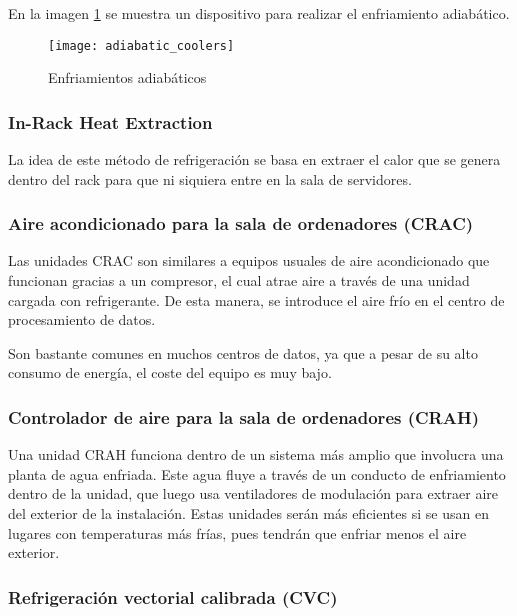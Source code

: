 En la imagen \ref{adiabatic_coolers} se muestra un dispositivo para realizar el enfriamiento adiabático.

\begin{figure}
    \begin{center}
    \caption{Enfriamientos adiabáticos}
    \label{adiabatic_coolers}
    \texttt{[image: adiabatic\_coolers]}
    \end{center}
\end{figure}

\subsubsection{In-Rack Heat Extraction}

La idea de este método de refrigeración se basa en extraer el calor que se genera dentro del rack para que ni siquiera entre en la sala de servidores.

\subsubsection{Aire acondicionado para la sala de ordenadores (CRAC)}

Las unidades CRAC son similares a equipos usuales de aire acondicionado que funcionan gracias a un compresor, el cual atrae aire a través de una unidad cargada con refrigerante. De esta manera, se introduce el aire frío en el centro de procesamiento de datos.

Son bastante comunes en muchos centros de datos, ya que a pesar de su alto consumo de energía, el coste del equipo es muy bajo.

\subsubsection{Controlador de aire para la sala de ordenadores (CRAH)}

Una unidad CRAH funciona dentro de un sistema más amplio que involucra una planta de agua enfriada. Este agua fluye a través de un conducto de enfriamiento dentro de la unidad, que luego usa ventiladores de modulación para extraer aire del exterior de la instalación. Estas unidades serán más eficientes si se usan en lugares con temperaturas más frías, pues tendrán que enfriar menos el aire exterior.

\subsubsection{Refrigeración vectorial calibrada (CVC)}

